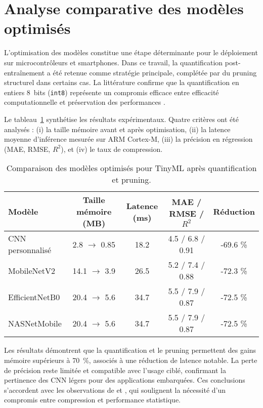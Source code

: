 \section{Analyse comparative des modèles optimisés}
\label{sec:comparaison_tinyml}

L’optimisation des modèles constitue une étape déterminante pour le déploiement sur microcontrôleurs et smartphones. Dans ce travail, la quantification post-entraînement a été retenue comme stratégie principale, complétée par du pruning structurel dans certains cas. La littérature confirme que la quantification en entiers 8~bits (\texttt{int8}) représente un compromis efficace entre efficacité computationnelle et préservation des performances \citep{jacob2018quantization, han2016deep, banbury2021micronets}.

Le tableau~\ref{tab:comparaison_modeles_optimises} synthétise les résultats expérimentaux. Quatre critères ont été analysés : (i) la taille mémoire avant et après optimisation, (ii) la latence moyenne d’inférence mesurée sur ARM Cortex-M, (iii) la précision en régression (MAE, RMSE, $R^2$), et (iv) le taux de compression.

\begin{table}[h!]
\centering
\caption{Comparaison des modèles optimisés pour TinyML après quantification et pruning.}
\label{tab:comparaison_modeles_optimises}
\begin{tabular}{|l|c|c|c|c|}
\hline
\textbf{Modèle} & \textbf{Taille mémoire (MB)} & \textbf{Latence (ms)} & \textbf{MAE / RMSE / $R^2$} & \textbf{Réduction} \\
\hline
CNN personnalisé & 2.8 $\rightarrow$ 0.85 & 18.2 & 4.5 / 6.8 / 0.91 & -69.6 \% \\
\hline
MobileNetV2      & 14.1 $\rightarrow$ 3.9  & 26.5 & 5.2 / 7.4 / 0.88 & -72.3 \% \\
\hline
EfficientNetB0   & 20.4 $\rightarrow$ 5.6  & 34.7 & 5.5 / 7.9 / 0.87 & -72.5 \% \\
NASNetMobile   & 20.4 $\rightarrow$ 5.6  & 34.7 & 5.5 / 7.9 / 0.87 & -72.5 \% \\
\hline
\end{tabular}
\end{table}

Les résultats démontrent que la quantification et le pruning permettent des gains mémoire supérieurs à 70~\%, associés à une réduction de latence notable. La perte de précision reste limitée et compatible avec l’usage ciblé, confirmant la pertinence des CNN légers pour des applications embarquées. Ces conclusions s’accordent avec les observations de \citet{lin2018towards} et \citet{wu2020comprehensive}, qui soulignent la nécessité d’un compromis entre compression et performance statistique.


